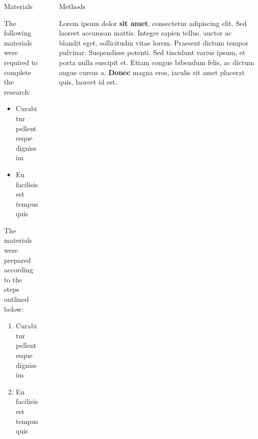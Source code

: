 \documentclass{article}
\begin{document}
\begin{frame}
\begin{columns}[t]
\begin{column}{\twocolwid}
\begin{columns}[t,totalwidth=\twocolwid]
\begin{column}{\onecolwid}
\begin{exampleblock}{Materials}

The following materials were required to complete the research:

\begin{itemize}
\item Curabitur pellentesque dignissim
\item Eu facilisis est tempus quis
\end{itemize}

The materials were prepared according to the steps outlined below:

\begin{enumerate}
\item Curabitur pellentesque dignissim
\item Eu facilisis est tempus quis
\end{enumerate}

\end{exampleblock}


\end{column} %
\begin{column}{\sepwid}\end{column} %

\begin{column}{\onecolwid}\vspace{-.74in} %


\begin{exampleblock}{Methods}

Lorem ipsum dolor \textbf{sit amet}, consectetur adipiscing elit. Sed laoreet accumsan mattis. Integer sapien tellus, auctor ac blandit eget, sollicitudin vitae lorem. Praesent dictum tempor pulvinar. Suspendisse potenti. Sed tincidunt varius ipsum, et porta nulla suscipit et. Etiam congue bibendum felis, ac dictum augue cursus a. \textbf{Donec} magna eros, iaculis sit amet placerat quis, laoreet id est.

\end{exampleblock}



\end{column}
\end{columns}
\end{column}
\end{columns}
\end{frame}
\end{document}
